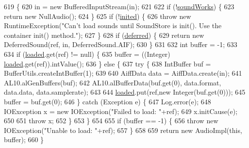 \begin{DoxyCode}
619                                                                        \{
620         in = \textcolor{keyword}{new} BufferedInputStream(in);
621 
622         \textcolor{keywordflow}{if} (!\mbox{\hyperlink{classorg_1_1newdawn_1_1slick_1_1openal_1_1_sound_store_ae563e9c1a01e333dc2350f1450f451fd}{soundWorks}}) \{
623             \textcolor{keywordflow}{return} \textcolor{keyword}{new} NullAudio();
624         \}
625         \textcolor{keywordflow}{if} (!\mbox{\hyperlink{classorg_1_1newdawn_1_1slick_1_1openal_1_1_sound_store_ad607db06655c505a0d3aa73eb16a06e1}{inited}}) \{
626             \textcolor{keywordflow}{throw} \textcolor{keyword}{new} RuntimeException(\textcolor{stringliteral}{"Can't load sounds until SoundStore is init(). Use the container
       init() method."});
627         \}
628         \textcolor{keywordflow}{if} (\mbox{\hyperlink{classorg_1_1newdawn_1_1slick_1_1openal_1_1_sound_store_a19c18b8305a40c99b51cde881a6f1d32}{deferred}}) \{
629             \textcolor{keywordflow}{return} \textcolor{keyword}{new} DeferredSound(ref, in, DeferredSound.AIF);
630         \}
631         
632         \textcolor{keywordtype}{int} buffer = -1;
633         
634         \textcolor{keywordflow}{if} (\mbox{\hyperlink{classorg_1_1newdawn_1_1slick_1_1openal_1_1_sound_store_a886b8963df160c2a880f5a33e37397fc}{loaded}}.get(ref) != null) \{
635             buffer = ((Integer) \mbox{\hyperlink{classorg_1_1newdawn_1_1slick_1_1openal_1_1_sound_store_a886b8963df160c2a880f5a33e37397fc}{loaded}}.get(ref)).intValue();
636         \} \textcolor{keywordflow}{else} \{
637             \textcolor{keywordflow}{try} \{
638                 IntBuffer buf = BufferUtils.createIntBuffer(1);
639                 
640                 AiffData data = AiffData.create(in);
641                 AL10.alGenBuffers(buf);
642                 AL10.alBufferData(buf.get(0), data.format, data.data, data.samplerate);
643                 
644                 \mbox{\hyperlink{classorg_1_1newdawn_1_1slick_1_1openal_1_1_sound_store_a886b8963df160c2a880f5a33e37397fc}{loaded}}.put(ref,\textcolor{keyword}{new} Integer(buf.get(0)));
645                 buffer = buf.get(0);
646             \} \textcolor{keywordflow}{catch} (Exception e) \{
647                 Log.error(e);
648                 IOException x = \textcolor{keyword}{new} IOException(\textcolor{stringliteral}{"Failed to load: "}+ref);
649                 x.initCause(e);
650                 
651                 \textcolor{keywordflow}{throw} x;
652             \}
653         \}
654         
655         \textcolor{keywordflow}{if} (buffer == -1) \{
656             \textcolor{keywordflow}{throw} \textcolor{keyword}{new} IOException(\textcolor{stringliteral}{"Unable to load: "}+ref);
657         \}
658         
659         \textcolor{keywordflow}{return} \textcolor{keyword}{new} AudioImpl(\textcolor{keyword}{this}, buffer);
660     \}
\end{DoxyCode}
